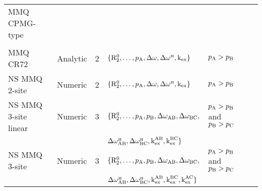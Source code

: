 \begin{landscape}
\begin{center}
\begin{small}
\begin{longtable}{llllll}
\clearpage
MMQ CPMG-type \\
\cline{1-1}
\\[-5pt]
MMQ CR72                 & Analytic & 2     & $\{\Rtwozero, \dots, \pA, \dw, \dwH, \kex\}$        & $\pA > \pB$                       & \citet{Korzhnev04a} \\
NS MMQ 2-site            & Numeric  & 2     & $\{\Rtwozero, \dots, \pA, \dw, \dwH, \kex\}$        & $\pA > \pB$                       & \citet{Korzhnev05b} \\
NS MMQ 3-site linear     & Numeric  & 3     & $\{\Rtwozero, \dots, \pA, \pB, \dwAB, \dwBC,$       & $\pA > \pB$ and $\pB > \pC$       & \citet{Korzhnev05b} \\
                         &          &       & $\dwHAB, \dwHBC, \kexAB, \kexBC\}$ \\
NS MMQ 3-site            & Numeric  & 3     & $\{\Rtwozero, \dots, \pA, \pB, \dwAB, \dwBC,$       & $\pA > \pB$ and $\pB > \pC$       & \citet{Korzhnev05b} \\
                         &          &       & $\dwHAB, \dwHBC, \kexAB, \kexBC, \kexAC\}$ \\


\end{longtable}
\end{small}
\end{center}
\end{landscape}
